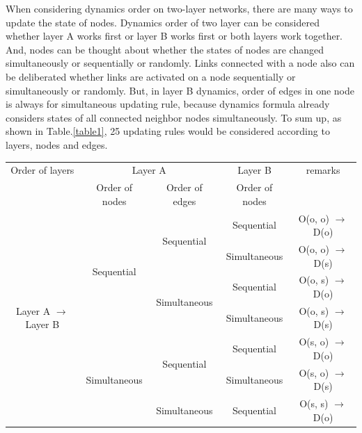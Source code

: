 When considering dynamics order on two-layer networks, there are many ways to update the state of nodes. Dynamics order of two layer can be considered whether layer A works first or layer B works first or both layers work together. And, nodes can be thought about whether the states of nodes are changed simultaneously or sequentially or randomly. Links connected with a node also can be deliberated whether links are activated on a node sequentially or simultaneously or randomly. But, in layer B dynamics, order of edges in one node is always for simultaneous updating rule, because dynamics formula already considers states of all connected neighbor nodes simultaneously. To sum up, as shown in Table.\ref{table1}, 25 updating rules would be considered according to layers, nodes and edges. 
\begin{table}[htp]
	\scriptsize
	\begin{center}
		\begin{tabular}{c|c|c|c|c}
			Order of layers                                  & \multicolumn{2}{|c|}{Layer A}                                      & Layer B                & remarks   \\ \cline{2-4}
			& Order of nodes                 & Order of edges                     & Order of nodes         &  \\ \hline
			\multirow{10}{*}{Layer A $\rightarrow$ Layer B} & \multirow{4}{*}{Sequential}    & \multirow{2}{*}{Sequential}        & Sequential             & O(o, o) $\to$ D(o) \\  \cline{4-5}  
			&                                &                                    & Simultaneous           & O(o, o) $\to$ D(s) \\  \cline{3-5}     
			&                                & \multirow{2}{*}{Simultaneous}      & Sequential             & O(o, s) $\to$ D(o) \\  \cline{4-5} 
			&                                &                                    & Simultaneous           & O(o, s) $\to$ D(s) \\  \cline{2-5} 
			& \multirow{4}{*}{Simultaneous}  & \multirow{2}{*}{Sequential}        & Sequential             & O(s, o) $\to$ D(o) \\  \cline{4-5}
			&                                &                                    & Simultaneous           & O(s, o) $\to$ D(s) \\  \cline{3-5}
			&                                & \multirow{2}{*}{Simultaneous}      & Sequential             & O(s, s) $\to$ D(o) \\  \cline{4-5}

\end{tabular}
\end{center}
\end{table}
